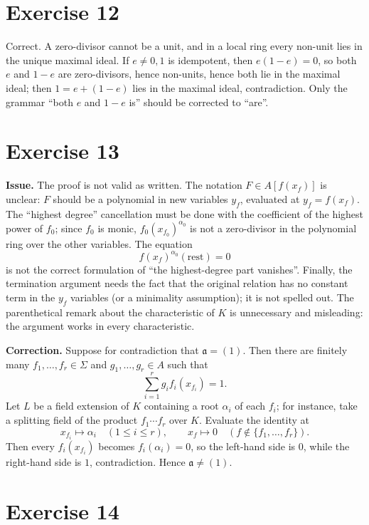 \documentclass[11pt]{article}
\newcommand{\fa}{\mathfrak a}
\begin{document}
\section*{Exercise 12}

Correct.  A zero-divisor cannot be a unit, and in a local ring every non-unit
lies in the unique maximal ideal.  If \(e\neq0,1\) is idempotent, then
\(e(1-e)=0\), so both \(e\) and \(1-e\) are zero-divisors, hence non-units,
hence both lie in the maximal ideal; then \(1=e+(1-e)\) lies in the maximal
ideal, contradiction.  Only the grammar ``both \(e\) and \(1-e\) is'' should
be corrected to ``are''.

\section*{Exercise 13}

\textbf{Issue.}  The proof is not valid as written.  The notation
\(F\in A[f(x_f)]\) is unclear: \(F\) should be a polynomial in new variables
\(y_f\), evaluated at \(y_f=f(x_{f})\).  The ``highest degree'' cancellation
must be done with the coefficient of the highest power of \(f_0\); since
\(f_0\) is monic, \(f_0(x_{f_0})^{\alpha_0}\) is not a zero-divisor in the
polynomial ring over the other variables.  The equation
\[
f(x_f)^{\alpha_0}(\text{rest})=0
\]
is not the correct formulation of ``the highest-degree part vanishes''.
Finally, the termination argument needs the fact that the original relation
has no constant term in the \(y_f\) variables (or a minimality assumption);
it is not spelled out.  The parenthetical remark about the characteristic of
\(K\) is unnecessary and misleading: the argument works in every
characteristic.

\textbf{Correction.}  Suppose for contradiction that \(\fa=(1)\).  Then there
are finitely many \(f_1,\ldots,f_r\in\Sigma\) and
\(g_1,\ldots,g_r\in A\) such that
\[
\sum_{i=1}^r g_i f_i(x_{f_i})=1.
\]
Let \(L\) be a field extension of \(K\) containing a root \(\alpha_i\) of each
\(f_i\); for instance, take a splitting field of the product
\(f_1\cdots f_r\) over \(K\).  Evaluate the identity at
\[
x_{f_i}\longmapsto\alpha_i\quad(1\le i\le r),\qquad
x_f\longmapsto0\quad(f\notin\{f_1,\ldots,f_r\}).
\]
Then every \(f_i(x_{f_i})\) becomes \(f_i(\alpha_i)=0\), so the left-hand
side is \(0\), while the right-hand side is \(1\), contradiction.  Hence
\(\fa\neq(1)\).

\section*{Exercise 14}
\end{document}
